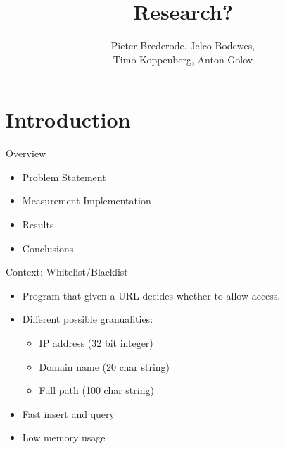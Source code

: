 \documentclass[10pt]{beamer}
\title{Research?}
\author{Pieter Brederode, Jelco Bodewes, \\ Timo Koppenberg, Anton Golov}
\institute{B3OMI}
\begin{document}
\begin{frame}
    \maketitle
\end{frame}


\section{Introduction}
\begin{frame}{Overview}
    \begin{itemize}
        \item Problem Statement
        \item Measurement Implementation
        \item Results
        \item Conclusions
    \end{itemize}
\end{frame}

\begin{frame}{Context: Whitelist/Blacklist}
    \begin{itemize}
        \item Program that given a URL decides whether to allow access.
        \item Different possible granualities:
        \begin{itemize}
            \item IP address (32 bit integer)
            \item Domain name (20 char string)
            \item Full path (100 char string)
        \end{itemize}
        \item Fast insert and query
        \item Low memory usage
    \end{itemize}
\end{frame}
\end{document}
